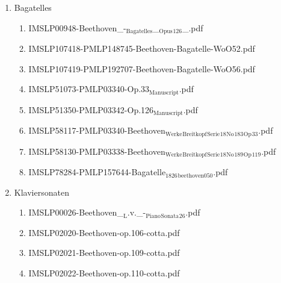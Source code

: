 \documentclass[11pt]{article}
\begin{document}
\begin{enumerate}
\begin{enumerate}
\item Bagatelles
\label{sec-1-1-1-1-44-9-6-6}
\begin{enumerate}
\item IMSLP00948-Beethoven\_-$_{\text{Bagatelles}}$\_$_{\text{Opus}}$$_{\text{126}}$\_.pdf
\label{sec-1-1-1-1-44-9-6-6-1}

\item IMSLP107418-PMLP148745-Beethoven-Bagatelle-WoO52.pdf
\label{sec-1-1-1-1-44-9-6-6-2}

\item IMSLP107419-PMLP192707-Beethoven-Bagatelle-WoO56.pdf
\label{sec-1-1-1-1-44-9-6-6-3}

\item IMSLP51073-PMLP03340-Op.33$_{\text{Manuscript}}$.pdf
\label{sec-1-1-1-1-44-9-6-6-4}

\item IMSLP51350-PMLP03342-Op.126$_{\text{Manuscript}}$.pdf
\label{sec-1-1-1-1-44-9-6-6-5}

\item IMSLP58117-PMLP03340-Beethoven$_{\text{Werke}}$$_{\text{Breitkopf}}$$_{\text{Serie}}$$_{\text{18}}$$_{\text{No}}$$_{\text{183}}$$_{\text{Op}}$$_{\text{33}}$.pdf
\label{sec-1-1-1-1-44-9-6-6-6}

\item IMSLP58130-PMLP03338-Beethoven$_{\text{Werke}}$$_{\text{Breitkopf}}$$_{\text{Serie}}$$_{\text{18}}$$_{\text{No}}$$_{\text{189}}$$_{\text{Op}}$$_{\text{119}}$.pdf
\label{sec-1-1-1-1-44-9-6-6-7}

\item IMSLP78284-PMLP157644-Bagatelle$_{\text{1826}}$$_{\text{beethoven050}}$.pdf
\label{sec-1-1-1-1-44-9-6-6-8}
\end{enumerate}

\item Klaviersonaten
\label{sec-1-1-1-1-44-9-6-7}
\begin{enumerate}
\item IMSLP00026-Beethoven\_$_{\text{L}}$.v.\_-$_{\text{Piano}}$$_{\text{Sonata}}$$_{\text{26}}$.pdf
\label{sec-1-1-1-1-44-9-6-7-1}

\item IMSLP02020-Beethoven-op.106-cotta.pdf
\label{sec-1-1-1-1-44-9-6-7-2}

\item IMSLP02021-Beethoven-op.109-cotta.pdf
\label{sec-1-1-1-1-44-9-6-7-3}

\item IMSLP02022-Beethoven-op.110-cotta.pdf
\label{sec-1-1-1-1-44-9-6-7-4}


\end{enumerate}
\end{enumerate}
\end{enumerate}
\end{document}
